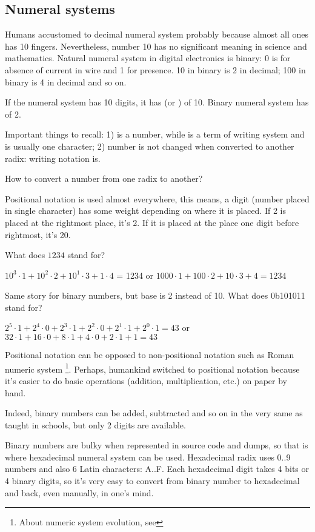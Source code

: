 \subsection{Numeral systems}

Humans accustomed to decimal numeral system probably because almost all ones has 10 fingers.
Nevertheless, number 10 has no significant meaning in science and mathematics.
Natural numeral system in digital electronics is binary: 0 is for absence of current in wire and 1 for presence.
10 in binary is 2 in decimal; 100 in binary is 4 in decimal and so on.

If the numeral system has 10 digits, it has  (or ) of 10.
Binary numeral system has  of 2.

Important things to recall:
1)  is a number, while  is a term of writing system and is usually one character;
2) number is not changed when converted to another radix: writing notation is.

How to convert a number from one radix to another?

Positional notation is used almost everywhere, this means, a digit (number placed in single character) has some weight depending on where it is placed.
If 2 is placed at the rightmost place, it's 2.
If it is placed at the place one digit before rightmost, it's 20.

What does $1234$ stand for?

$10^3 \cdot 1 + 10^2 \cdot 2 + 10^1 \cdot 3 + 1 \cdot 4$ = 1234 or 
$1000 \cdot 1 + 100 \cdot 2 + 10 \cdot 3 + 4 = 1234$

Same story for binary numbers, but base is 2 instead of 10.
What does 0b101011 stand for?

$2^5 \cdot 1 + 2^4 \cdot 0 + 2^3 \cdot 1 + 2^2 \cdot 0 + 2^1 \cdot 1 + 2^0 \cdot 1 = 43$ or
$32 \cdot 1 + 16 \cdot 0 + 8 \cdot 1 + 4 \cdot 0 + 2 \cdot 1 + 1 = 43$

Positional notation can be opposed to non-positional notation such as Roman numeric system
\footnote{About numeric system evolution, see }.
Perhaps, humankind switched to positional notation because it's easier to do basic operations (addition, multiplication, etc.) on paper by hand.

Indeed, binary numbers can be added, subtracted and so on in the very same as taught in schools, but only 2 digits are available.

Binary numbers are bulky when represented in source code and dumps, so that is where hexadecimal numeral system can be used.
Hexadecimal radix uses 0..9 numbers and also 6 Latin characters: A..F.
Each hexadecimal digit takes 4 bits or 4 binary digits, so it's very easy to convert from binary number to hexadecimal and back, even manually, in one's mind.

